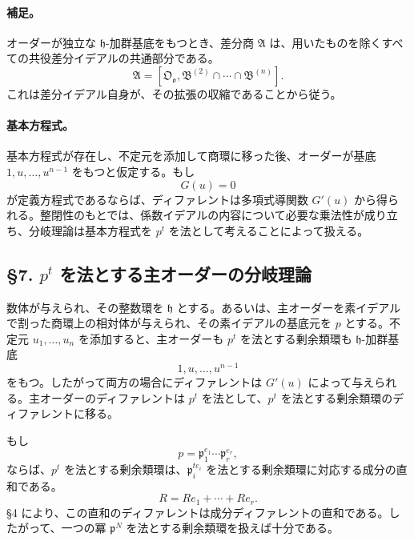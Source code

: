 \documentclass[11pt]{article}
\begin{document}
\paragraph{補足。}
オーダーが独立な \(\mathfrak h\)-加群基底をもつとき、差分商 \(\mathfrak A\) は、用いたものを除くすべての共役差分イデアルの共通部分である。
\[
        \mathfrak A=[\mathfrak O_{\mathfrak o},
        \mathfrak B^{(2)}\cap\cdots\cap\mathfrak B^{(n)}].
\]
これは差分イデアル自身が、その拡張の収縮であることから従う。

\paragraph{基本方程式。}
基本方程式が存在し、不定元を添加して商環に移った後、オーダーが基底 \(1,u,\ldots,u^{n-1}\) をもつと仮定する。もし
\[
        G(u)=0
\]
が定義方程式であるならば、ディファレントは多項式導関数 \(G'(u)\) から得られる。整閉性のもとでは、係数イデアルの内容について必要な乗法性が成り立ち、分岐理論は基本方程式を \(p^t\) を法として考えることによって扱える。

\subsection*{§7. \(p^t\) を法とする主オーダーの分岐理論}

数体が与えられ、その整数環を \(\mathfrak h\) とする。あるいは、主オーダーを素イデアルで割った商環上の相対体が与えられ、その素イデアルの基底元を \(p\) とする。不定元 \(u_1,\ldots,u_n\) を添加すると、主オーダーも \(p^t\) を法とする剰余類環も \(\mathfrak h\)-加群基底
\[
        1,u,\ldots,u^{n-1}
\]
をもつ。したがって両方の場合にディファレントは \(G'(u)\) によって与えられる。主オーダーのディファレントは \(p^t\) を法として、\(p^t\) を法とする剰余類環のディファレントに移る。

もし
\[
        p=\mathfrak p_1^{e_1}\cdots\mathfrak p_r^{e_r},
\]
ならば、\(p^t\) を法とする剰余類環は、\(\mathfrak p_i^{te_i}\) を法とする剰余類環に対応する成分の直和である。
\[
        R=Re_1+\cdots+Re_r.
\]
§4 により、この直和のディファレントは成分ディファレントの直和である。したがって、一つの冪 \(\mathfrak p^N\) を法とする剰余類環を扱えば十分である。
\end{document}
